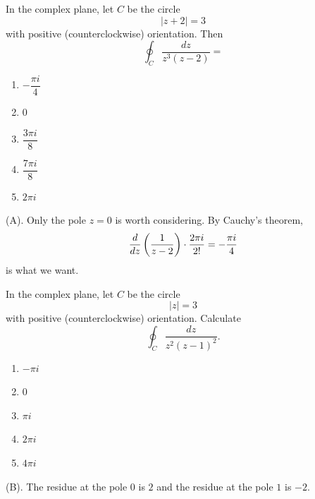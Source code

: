 \begin{exercise}
In the complex plane, let $C$ be the circle
\[
|z+2|=3
\]
with positive (counterclockwise) orientation. Then
\[
\oint_C \frac{dz}{z^3(z-2)}
=
\]

\begin{enumerate}[label=(\Alph*)]
    \item $-\dfrac{\pi i}{4}$
    \item $0$
    \item $\dfrac{3\pi i}{8}$
    \item $\dfrac{7\pi i}{8}$
    \item $2\pi i$
\end{enumerate}
\end{exercise}
\begin{solution}
(A). Only the pole $z = 0$ is worth considering. By Cauchy's theorem,
\[
\frac{d }{d z}\left(\frac{1}{z-2}\right) \cdot \frac{2\pi i}{2!} = -\frac{\pi i }{4}
\]
is what we want.
\end{solution}

\begin{exercise}
In the complex plane, let $C$ be the circle
\[
|z|=3
\]
with positive (counterclockwise) orientation. Calculate
\[
\oint_C \frac{dz}{z^2(z-1)^2}.
\]

\begin{enumerate}[label=(\Alph*)]
    \item $-\pi i$
    \item $0$
    \item $\pi i$
    \item $2\pi i$
    \item $4\pi i$
\end{enumerate}
\end{exercise}
\begin{solution}
(B). The residue at the pole $0$ is $2$ and the residue at the pole $1$ is $-2$.
\end{solution}

